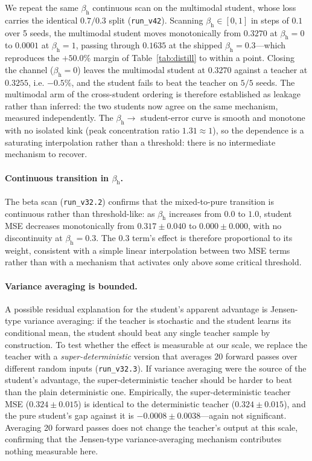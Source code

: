 \documentclass[10pt,twoside]{article}
\theoremstyle{definition}
\begin{document}
We repeat the same $\beta_{\text{h}}$ continuous scan on the multimodal student, whose loss carries the identical $0.7/0.3$ split (\texttt{run\_v42}). Scanning $\beta_{\text{h}}\in[0,1]$ in steps of $0.1$ over 5 seeds, the multimodal student moves monotonically from $0.3270$ at $\beta_{\text{h}}{=}0$ to $0.0001$ at $\beta_{\text{h}}{=}1$, passing through $0.1635$ at the shipped $\beta_{\text{h}}{=}0.3$---which reproduces the $+50.0\%$ margin of Table~\ref{tab:distill} to within a point. Closing the channel ($\beta_{\text{h}}{=}0$) leaves the multimodal student at $0.3270$ against a teacher at $0.3255$, i.e. $-0.5\%$, and the student fails to beat the teacher on $5/5$ seeds. The multimodal arm of the cross-student ordering is therefore established as leakage rather than inferred: the two students now agree on the same mechanism, measured independently. The $\beta_{\text{h}}\rightarrow$ student-error curve is smooth and monotone with no isolated kink (peak concentration ratio $1.31\approx1$), so the dependence is a saturating interpolation rather than a threshold: there is no intermediate mechanism to recover.

\paragraph{Continuous transition in $\beta_{\text{h}}$.}
The beta scan (\texttt{run\_v32.2}) confirms that the mixed-to-pure transition is continuous rather than threshold-like: as $\beta_{\text{h}}$ increases from $0.0$ to $1.0$, student MSE decreases monotonically from $0.317 \pm 0.040$ to $0.000 \pm 0.000$, with no discontinuity at $\beta_{\text{h}}=0.3$. The $0.3$ term's effect is therefore proportional to its weight, consistent with a simple linear interpolation between two MSE terms rather than with a mechanism that activates only above some critical threshold.

\paragraph{Variance averaging is bounded.}
A possible residual explanation for the student's apparent advantage is Jensen-type variance averaging: if the teacher is stochastic and the student learns its conditional mean, the student should beat any single teacher sample by construction. To test whether the effect is measurable at our scale, we replace the teacher with a \emph{super-deterministic} version that averages 20 forward passes over different random inputs (\texttt{run\_v32.3}). If variance averaging were the source of the student's advantage, the super-deterministic teacher should be harder to beat than the plain deterministic one. Empirically, the super-deterministic teacher MSE ($0.324 \pm 0.015$) is identical to the deterministic teacher ($0.324 \pm 0.015$), and the pure student's gap against it is $-0.0008 \pm 0.0038$---again not significant. Averaging 20 forward passes does not change the teacher's output at this scale, confirming that the Jensen-type variance-averaging mechanism contributes nothing measurable here.
\end{document}
